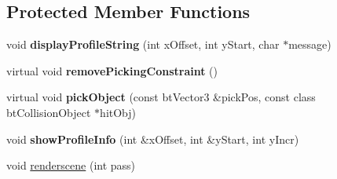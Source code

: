 \subsection*{Protected Member Functions}
\begin{DoxyCompactItemize}
\item 
\hypertarget{class_demo_application_ac518439076bb83ad5d946235fc9a0f70}{void {\bfseries display\+Profile\+String} (int x\+Offset, int y\+Start, char $\ast$message)}\label{class_demo_application_ac518439076bb83ad5d946235fc9a0f70}

\item 
\hypertarget{class_demo_application_a8e806bd8b967a6c8212e53e9da35312f}{virtual void {\bfseries remove\+Picking\+Constraint} ()}\label{class_demo_application_a8e806bd8b967a6c8212e53e9da35312f}

\item 
\hypertarget{class_demo_application_a7415f7abc632678e0f5c6421c8c661bb}{virtual void {\bfseries pick\+Object} (const bt\+Vector3 \&pick\+Pos, const class bt\+Collision\+Object $\ast$hit\+Obj)}\label{class_demo_application_a7415f7abc632678e0f5c6421c8c661bb}

\item 
\hypertarget{class_demo_application_a325cdc9670aac2180a783c08629f6e29}{void {\bfseries show\+Profile\+Info} (int \&x\+Offset, int \&y\+Start, int y\+Incr)}\label{class_demo_application_a325cdc9670aac2180a783c08629f6e29}

\item 
void \hyperlink{class_demo_application_acf6f92bb513e7ed52d22b5428ff93b7d}{renderscene} (int pass)
\end{DoxyCompactItemize}
